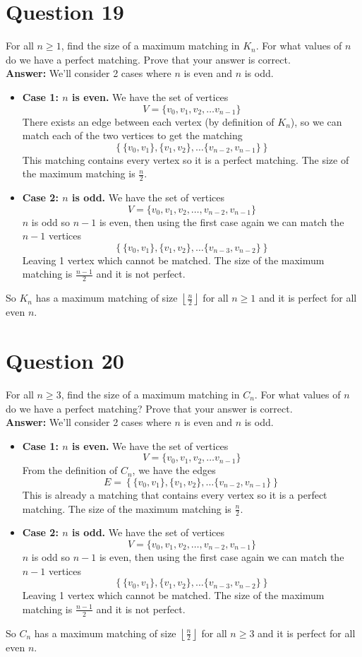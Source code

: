 \documentclass[openany]{report}
\begin{document}
\section{Question 19}
For all $n\geq 1$, find the size of a maximum matching in $K_n$. For what values of $n$ do we have a perfect matching. Prove that your answer is correct.\\[2ex]
\textbf{Answer:} We'll consider 2 cases where $n$ is even and $n$ is odd. 
\begin{itemize}
    \item \textbf{Case 1: $n$ is even.} We have the set of vertices 
    \[V = \{v_0, v_1, v_2, \ldots v_{n-1}\}\]
    There exists an edge between each vertex (by definition of $K_n$), so we can match each of the two vertices to get the matching 
    \[\left\{\{v_0, v_1\}, \{v_1, v_2\}, \ldots \{v_{n-2}, v_{n-1}\}\right\}\]
    This matching contains every vertex so it is a perfect matching. The size of the maximum matching is $\frac{n}{2}$.
    \item \textbf{Case 2: $n$ is odd.} We have the set of vertices
    \[V = \{v_0, v_1, v_2, \ldots, v_{n-2}, v_{n-1}\}\]
    $n$ is odd so $n-1$ is even, then using the first case again we can match the $n-1$ vertices 
    \[\left\{\{v_0, v_1\}, \{v_1, v_2\}, \ldots \{v_{n-3}, v_{n-2}\}\right\}\]
    Leaving 1 vertex which cannot be matched. The size of the maximum matching is $\frac{n-1}{2}$ and it is not perfect. 
\end{itemize}
So $K_n$ has a maximum matching of size $\left\lfloor\frac{n}{2}\right\rfloor$ for all $n \geq 1$ and it is perfect for all even $n$.
\section{Question 20}
For all $n \geq 3$, find the size of a maximum matching in $C_n$. For what values of $n$ do we have a perfect matching? Prove that your answer is correct.\\[2ex]
\textbf{Answer:} We'll consider 2 cases where $n$ is even and $n$ is odd.
\begin{itemize}
    \item \textbf{Case 1: $n$ is even.} We have the set of vertices 
    \[V = \{v_0, v_1, v_2, \ldots v_{n-1}\}\]
    From the definition of $C_n$, we have the edges 
    \[E = \left\{\{v_0, v_1\}, \{v_1, v_2\}, \ldots \{v_{n-2}, v_{n-1}\}\right\}\]
    This is already a matching that contains every vertex so it is a perfect matching. The size of the maximum matching is $\frac{n}{2}$.
    \item \textbf{Case 2: $n$ is odd.} We have the set of vertices
    \[V = \{v_0, v_1, v_2, \ldots, v_{n-2}, v_{n-1}\}\]
    $n$ is odd so $n-1$ is even, then using the first case again we can match the $n-1$ vertices 
    \[\left\{\{v_0, v_1\}, \{v_1, v_2\}, \ldots \{v_{n-3}, v_{n-2}\}\right\}\]
    Leaving 1 vertex which cannot be matched. The size of the maximum matching is $\frac{n-1}{2}$ and it is not perfect. 
\end{itemize}
So $C_n$ has a maximum matching of size $\left\lfloor\frac{n}{2}\right\rfloor$ for all $n \geq 3$ and it is perfect for all even $n$.
\end{document}
